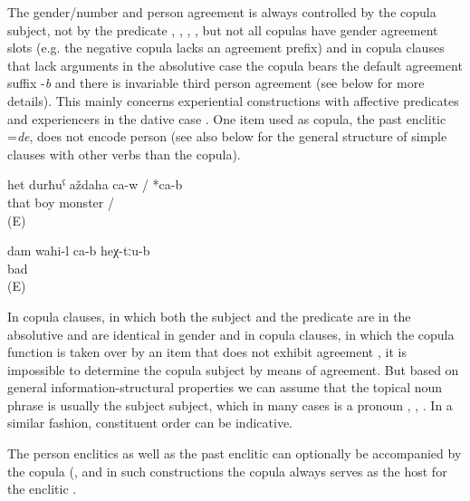 The gender/number and person agreement is always controlled by the copula subject, not by the predicate , ,  ,  , but not all copulas have gender agreement slots (e.g. the negative copula lacks an agreement prefix) and in copula clauses that lack arguments in the absolutive case the copula bears the default agreement suffix -\textit{b} and there is invariable third person agreement (see  below for more details). This mainly concerns experiential constructions with affective predicates and experiencers in the dative case . One item used as copula, the past enclitic =\textit{de}, does not encode person  (see also  below for the general structure of simple clauses with other verbs than the copula).

\begin{exe}
	\ex	\label{ex:‎‎‎That boy is a monster}
	\gll	het	durħuˁ	aždaha	ca-w	/ *ca-b\\
		that	boy	monster		/ \\
	\glt	{} (E)
	
	\ex	\label{ex:I feel(s) bad there}
	\gll	dam	wahi-l	ca-b	heχ-tːu-b\\
			bad		\\
	\glt	{} (E)	
	
\end{exe}


In copula clauses, in which both the subject and the predicate are in the absolutive and are identical in gender  and in copula clauses, in which the copula function is taken over by an item that does not exhibit agreement , it is impossible to determine the copula subject by means of agreement. But based on general information-structural properties we can assume that the topical noun phrase is usually the subject subject, which in many cases is a pronoun , , . In a similar fashion, constituent order can be indicative. 

The person enclitics as well as the past enclitic can optionally be accompanied by the copula (, and in such constructions the copula always serves as the host for the enclitic . 


